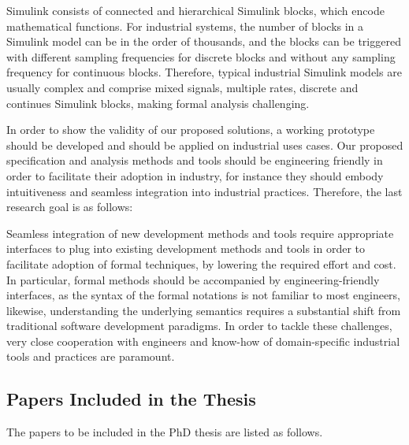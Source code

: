 Simulink consists of connected and hierarchical Simulink blocks, which encode mathematical functions. For industrial systems, the number of blocks in a Simulink model can be in the order of thousands, and the blocks can be triggered with different sampling frequencies for discrete blocks and without any sampling frequency 
for continuous blocks. Therefore, typical industrial Simulink models are usually complex and comprise mixed signals, multiple rates, discrete and continues Simulink blocks, making formal analysis challenging.

In order to show the validity of our proposed solutions, a working prototype should be developed and should be applied on industrial uses cases. Our proposed specification and analysis methods and tools should be engineering friendly in order to facilitate their adoption in industry, for instance they should embody intuitiveness and seamless integration into industrial practices. Therefore, the last research goal is as follows:
\begin{researchgoal}
\end{researchgoal}

Seamless integration of new development methods and tools require appropriate interfaces to plug into existing development methods and tools in order to facilitate adoption of formal techniques, by lowering the required effort and cost. In particular, formal methods should be accompanied by engineering-friendly interfaces, as the syntax of the formal notations is not familiar to most engineers, likewise, understanding the underlying semantics requires a substantial shift from traditional software development paradigms. In order to tackle these challenges, very close cooperation with engineers and know-how of domain-specific industrial tools and practices are paramount.

\subsection{Papers Included in the Thesis}\label{papersincl}
The papers to be included in the PhD thesis are listed as follows.


